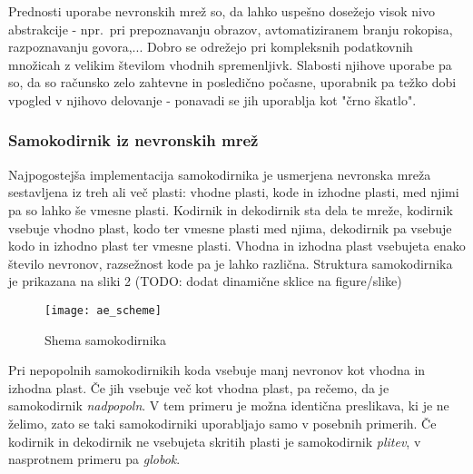 \documentclass[12pt,a4paper,twoside]{article}
\theoremstyle{definition} %
\theoremstyle{plain} %
\numberwithin{equation}{section}  %
\begin{document}
Prednosti uporabe nevronskih mrež so, da lahko uspešno dosežejo visok nivo abstrakcije - npr.\ pri prepoznavanju obrazov, avtomatiziranem branju rokopisa, razpoznavanju govora,... 
Dobro se odrežejo pri kompleksnih podatkovnih množicah z velikim številom vhodnih spremenljivk. 
Slabosti njihove uporabe pa so, da so računsko zelo zahtevne in posledično počasne, uporabnik pa težko dobi vpogled v njihovo delovanje - ponavadi se jih uporablja kot "črno škatlo".



\subsubsection{Samokodirnik iz nevronskih mrež}


Najpogostejša implementacija samokodirnika je usmerjena nevronska mreža sestavljena iz treh ali več plasti: vhodne plasti, kode in izhodne plasti, med njimi pa so lahko še vmesne plasti. 
Kodirnik in dekodirnik sta dela te mreže, kodirnik vsebuje vhodno plast, kodo ter vmesne plasti med njima, dekodirnik pa vsebuje kodo in izhodno plast ter vmesne plasti. 
Vhodna in izhodna plast vsebujeta enako število nevronov, razsežnost kode pa je lahko različna. 
Struktura samokodirnika je prikazana na sliki 2 (TODO: dodat dinamične sklice na figure/slike)

\begin{figure}[h!]

\begin{center}
\texttt{[image: ae\_scheme]}
\end{center}

\caption{Shema samokodirnika}
\end{figure}

Pri nepopolnih samokodirnikih koda vsebuje manj nevronov kot vhodna in izhodna plast. 
Če jih vsebuje več kot vhodna plast, pa rečemo, da je samokodirnik \emph{nadpopoln}. 
V tem primeru je možna identična preslikava, ki je ne želimo, zato se taki samokodirniki uporabljajo samo v posebnih primerih. 
Če kodirnik in dekodirnik ne vsebujeta skritih plasti je samokodirnik \emph{plitev}, v nasprotnem primeru pa \emph{globok}.
\end{document}
